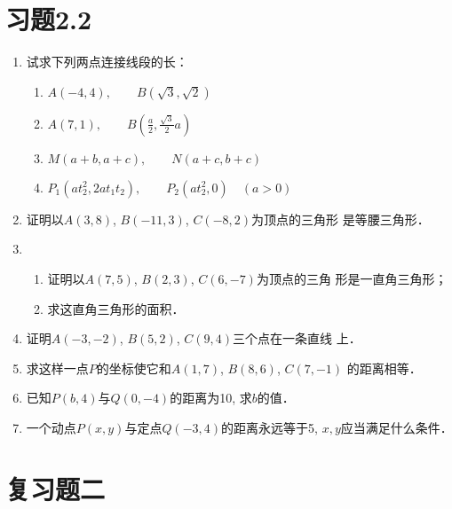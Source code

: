 \section*{习题2.2}
\begin{enumerate}
    \item 试求下列两点连接线段的长：
\begin{enumerate}
    \item $A(-4,4),\qquad B(\sqrt{3},\sqrt{2})$
    \item $A(7,1),\qquad B\left(\frac{a}{2},\frac{\sqrt{3}}{2}a\right)$
    \item $M(a+b,a+c),\qquad N(a+c,b+c)$
    \item $P_1(at^2_2, 2at_1t_2),\qquad P_2(at^2_2,0)\quad (a>0)$
\end{enumerate}

\item 证明以$A(3,8)$, $B(-11,3)$, $C(-8,2)$为顶点的三角形
是等腰三角形．
\item \begin{enumerate}
    \item 证明以$A(7,5)$, $B(2,3)$, $C(6,-7)$为顶点的三角
形是一直角三角形；
\item 求这直角三角形的面积．
\end{enumerate}

\item  证明$A(-3,-2)$, $B(5,2)$, $C(9,4)$三个点在一条直线
上．
\item 求这样一点$P$的坐标使它和$A(1,7)$, $B(8,6)$, $C(7,-1)$
的距离相等．
\item 已知$P(b,4)$与$Q(0,-4)$的距离为10, 求$b$的值．
\item 一个动点$P(x,y)$与定点$Q(-3,4)$的距离永远等于5, $x,
y$应当满足什么条件．
\end{enumerate}


\section*{复习题二}


